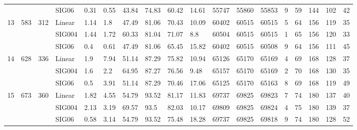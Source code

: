 \begin{longtable}{llllllllllllllllll}
 &  &  & SIG06 & \num{0.31} & \num{0.55} & \num{43.84} & \num{74.83} & \num{60.42} & \num{14.61} & \num{55747} & \num{55860} & \num{55853} & \num{9} & \num{59} & \num{144} & \num{102} & \num{42} \\
\cline{1-18} \cline{2-18} \cline{3-18}
\multirow[t]{3}{*}{13} & \multirow[t]{3}{*}{583} & \multirow[t]{3}{*}{312} & Linear & \num{1.14} & \num{1.8} & \num{47.49} & \num{81.06} & \num{70.43} & \num{10.09} & \num{60402} & \num{60515} & \num{60515} & \num{5} & \num{64} & \num{156} & \num{119} & \num{35} \\
 &  &  & SIG004 & \num{1.44} & \num{1.72} & \num{60.33} & \num{81.04} & \num{71.07} & \num{8.8} & \num{60504} & \num{60515} & \num{60515} & \num{1} & \num{65} & \num{156} & \num{120} & \num{33} \\
 &  &  & SIG06 & \num{0.4} & \num{0.61} & \num{47.49} & \num{81.06} & \num{65.45} & \num{15.82} & \num{60402} & \num{60515} & \num{60508} & \num{9} & \num{64} & \num{156} & \num{111} & \num{45} \\
\cline{1-18} \cline{2-18} \cline{3-18}
\multirow[t]{3}{*}{14} & \multirow[t]{3}{*}{628} & \multirow[t]{3}{*}{336} & Linear & \num{1.9} & \num{7.94} & \num{51.14} & \num{87.29} & \num{75.82} & \num{10.94} & \num{65126} & \num{65170} & \num{65169} & \num{4} & \num{69} & \num{168} & \num{128} & \num{37} \\
 &  &  & SIG004 & \num{1.6} & \num{2.2} & \num{64.95} & \num{87.27} & \num{76.56} & \num{9.48} & \num{65157} & \num{65170} & \num{65169} & \num{2} & \num{70} & \num{168} & \num{130} & \num{35} \\
 &  &  & SIG06 & \num{0.5} & \num{3.91} & \num{51.14} & \num{87.29} & \num{70.46} & \num{17.06} & \num{65125} & \num{65170} & \num{65163} & \num{8} & \num{69} & \num{168} & \num{119} & \num{49} \\
\cline{1-18} \cline{2-18} \cline{3-18}
\multirow[t]{3}{*}{15} & \multirow[t]{3}{*}{673} & \multirow[t]{3}{*}{360} & Linear & \num{1.82} & \num{4.55} & \num{54.79} & \num{93.52} & \num{81.17} & \num{11.83} & \num{69737} & \num{69825} & \num{69823} & \num{7} & \num{74} & \num{180} & \num{137} & \num{40} \\
 &  &  & SIG004 & \num{2.13} & \num{3.19} & \num{69.57} & \num{93.5} & \num{82.03} & \num{10.17} & \num{69809} & \num{69825} & \num{69824} & \num{4} & \num{75} & \num{180} & \num{139} & \num{37} \\
 &  &  & SIG06 & \num{0.58} & \num{3.14} & \num{54.79} & \num{93.52} & \num{75.48} & \num{18.28} & \num{69737} & \num{69825} & \num{69818} & \num{9} & \num{74} & \num{180} & \num{128} & \num{52} \\
\cline{1-18} \cline{2-18} \cline{3-18}
\end{longtable}

